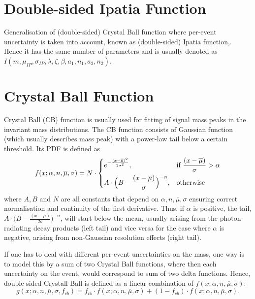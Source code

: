 \label{sec:PDFS}


\section{Double-sided Ipatia Function}
\label{IP}
Generalisation of (double-sided) Crystal Ball function where per-event uncertainty is taken into account, known as (double-sided) Ipatia function,\cite{Santos:2013gra}. 
Hence it has the same number of parameters and is usually denoted as $I(m,\mu_{IP},\sigma_{IP},\lambda,\zeta,\beta,a_{1},n_{1},a_{2},n_{2})$.


\section{Crystal Ball Function}
\label{CB}
Crystal Ball (\Gls{CB}) function \cite{Skwarnicki:1986xj}
is usually used for fitting of signal mass peaks in the invariant mass distributions. The \gls{CB} function consists of Gaussian function (which usually describes mass peak) with a power-law tail below a certain threshold. Its PDF is defined as
\begin{equation}
  f(x; \alpha,n,\overline{\mu},\sigma) = N \cdot
  \begin{dcases}
    e^{-\frac{(x-\overline{\mu})^{2}}{2\sigma^{2}}},& \text{if } \frac{(x-\overline{\mu})}{\sigma}  >\alpha\\
    A \cdot\Big(B - \frac{(x-\overline{\mu})}{\sigma}\Big)^{-n}, & \text{otherwise}
  \end{dcases}
  \label{Eq:CB}
\end{equation}
where $A, B$ and $N$ are all constants that depend on ${\alpha,n,\overline{\mu},\sigma}$ ensuring correct normalisation and continuity of the first derivative. Thus, if $\alpha$ is positive, the tail, $A\cdot \Big(B - \frac{(x-\overline{\mu})}{2\sigma}\Big)^{-n}$, will start below the mean, usually arising from the photon-radiating decay products (left tail) and vice versa for the case where $\alpha$ is negative, arising from non-Gaussian resolution effects (right tail).

If one has to deal with different per-event uncertainties on the mass, one way is to model this by a sum of two Crystal Ball functions, where then each uncertainty on the event, would correspond to sum of two delta functions. Hence, double-sided Crystall Ball is defined as a linear combination of $f(x; \alpha,n,\overline{\mu},\sigma)$:
\begin{equation}
	g(x; \alpha,n,\overline{\mu},\sigma, f_{cb}) = f_{cb} \cdot f(x; \alpha,n,\overline{\mu},\sigma) + (1-f_{cb})\cdot f(x; \alpha,n,\overline{\mu},\sigma).
\end{equation}


